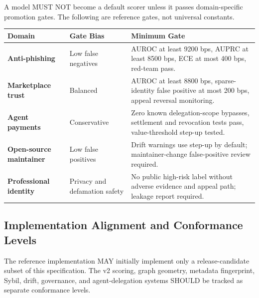 \documentclass[11pt]{article}
\begin{document}
A model MUST NOT become a default scorer unless it passes domain-specific promotion gates. The following are reference gates, not universal constants.

\begin{center}
\begin{tabularx}{\textwidth}{>{\bfseries}p{} p{} X}
\toprule
Domain & Gate Bias & Minimum Gate \\
\midrule
Anti-phishing & Low false negatives & AUROC at least 9200 bps, AUPRC at least 8500 bps, ECE at most 400 bps, red-team pass. \\
Marketplace trust & Balanced & AUROC at least 8800 bps, sparse-identity false positive at most 200 bps, appeal reversal monitoring. \\
Agent payments & Conservative & Zero known delegation-scope bypasses, settlement and revocation tests pass, value-threshold step-up tested. \\
Open-source maintainer & Low false positives & Drift warnings use step-up by default; maintainer-change false-positive review required. \\
Professional identity & Privacy and defamation safety & No public high-risk label without adverse evidence and appeal path; leakage report required. \\
\bottomrule
\end{tabularx}
\end{center}

\subsection{Implementation Alignment and Conformance Levels}

The reference implementation MAY initially implement only a release-candidate subset of this specification. The v2 scoring, graph geometry, metadata fingerprint, Sybil, drift, governance, and agent-delegation systems SHOULD be tracked as separate conformance levels.
\end{document}
